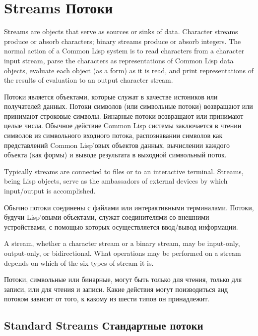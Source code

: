 
\clearpage\def\pagestatus{FINAL PROOF}

\chapter{Streams Потоки}
\label{STREAM}

Streams are objects that serve as sources or sinks of data.
Character streams produce or absorb characters;
binary streams produce or absorb integers.
The normal action of a Common Lisp system is to read characters from
a character input stream, parse the characters as representations
of Common Lisp data objects, evaluate each object (as a form) as it is read, and
print representations of the results of
evaluation to an output character stream.

Потоки является объектами, которые служат в качестве истоников или получателей
данных.
Потоки символов (или символьные потоки) возвращают или принимают строковые
символы.
Бинарные потоки возвращают или принимают целые числа.
Обычное действие Common Lisp системы заключается в чтении символов из
символьного входного потока, распознавании символов как представлений Common
Lisp'овых объектов данных, вычислении каждого объекта (как формы) и выводе
результата в выходной символьный поток.


Typically streams are connected to files or to an interactive terminal.
Streams, being Lisp objects, serve as the ambassadors of external
devices by which input/output is accomplished.

Обычно потоки соединены с файлами или интерактивными терминалами. 
Потоки, будучи Lisp'овыми объектами, служат соединителями со внешними
устройствами, с помощью которых осуществляется ввод/вывод информации.

A stream, whether a character stream or a binary
stream, may be input-only, output-only, or bidirectional.
What operations may be performed on a stream depends on which of
the six types of stream it is.

Потоки, символьные или бинарные, могут быть только для чтения, только для
записи, или для чтения и записи.
Какие действия могут поизводиться анд потоком зависит от того, к какому из шести
типов он принадлежит.

\section {Standard Streams Стандартные потоки}

